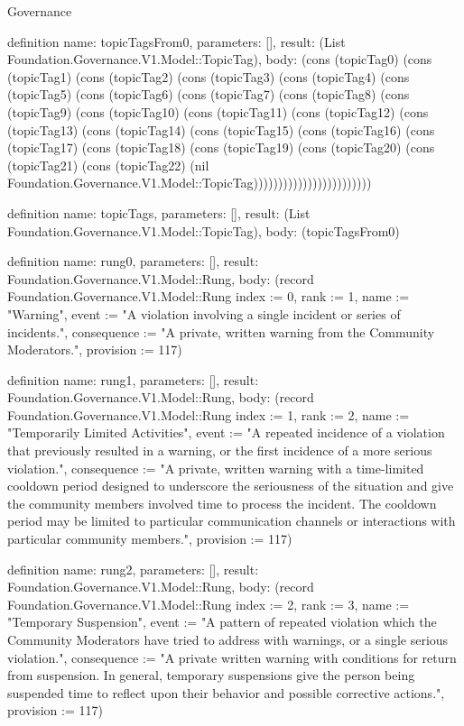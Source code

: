 \begin{lexlean}{Governance}
\begin{semanticmodule}
definition{
  name: topicTagsFrom0,
  parameters: [],
  result: (List Foundation.Governance.V1.Model::TopicTag),
  body: (cons (topicTag0) (cons (topicTag1) (cons (topicTag2) (cons (topicTag3) (cons (topicTag4) (cons (topicTag5) (cons (topicTag6) (cons (topicTag7) (cons (topicTag8) (cons (topicTag9) (cons (topicTag10) (cons (topicTag11) (cons (topicTag12) (cons (topicTag13) (cons (topicTag14) (cons (topicTag15) (cons (topicTag16) (cons (topicTag17) (cons (topicTag18) (cons (topicTag19) (cons (topicTag20) (cons (topicTag21) (cons (topicTag22) (nil Foundation.Governance.V1.Model::TopicTag))))))))))))))))))))))))
}

definition{
  name: topicTags,
  parameters: [],
  result: (List Foundation.Governance.V1.Model::TopicTag),
  body: (topicTagsFrom0)
}

definition{
  name: rung0,
  parameters: [],
  result: Foundation.Governance.V1.Model::Rung,
  body: (record Foundation.Governance.V1.Model::Rung {index := 0, rank := 1, name := "Warning", event := "A violation involving a single incident or series of incidents.", consequence := "A private, written warning from the Community Moderators.", provision := 117})
}

definition{
  name: rung1,
  parameters: [],
  result: Foundation.Governance.V1.Model::Rung,
  body: (record Foundation.Governance.V1.Model::Rung {index := 1, rank := 2, name := "Temporarily Limited Activities", event := "A repeated incidence of a violation that previously resulted in a warning, or the first incidence of a more serious violation.", consequence := "A private, written warning with a time-limited cooldown period designed to underscore the seriousness of the situation and give the community members involved time to process the incident. The cooldown period may be limited to particular communication channels or interactions with particular community members.", provision := 117})
}

definition{
  name: rung2,
  parameters: [],
  result: Foundation.Governance.V1.Model::Rung,
  body: (record Foundation.Governance.V1.Model::Rung {index := 2, rank := 3, name := "Temporary Suspension", event := "A pattern of repeated violation which the Community Moderators have tried to address with warnings, or a single serious violation.", consequence := "A private written warning with conditions for return from suspension. In general, temporary suspensions give the person being suspended time to reflect upon their behavior and possible corrective actions.", provision := 117})
}


\end{semanticmodule}
\end{lexlean}
